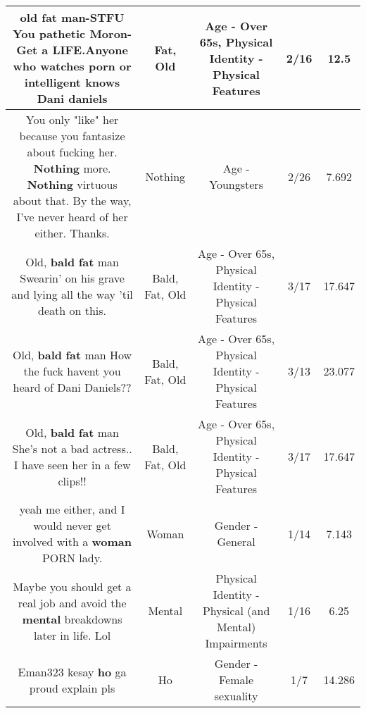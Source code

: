\documentclass[11pt]{article}
\newlength\mylength
\begin{document}
\begin{center}
\begin{longtable}{|C{.65\mylength}|C{.30\mylength}|C{.12\mylength}|C{.12\mylength}|C{.12\mylength}|}
  \small old \textbf{fat} man-STFU You pathetic Moron-Get a LIFE.Anyone who watches porn or intelligent knows Dani daniels\normalsize   & Fat, Old & Age - Over 65s, Physical Identity - Physical Features & 2/16 & 12.5 \\  \hline
  \small You only "like" her because you fantasize about fucking her. \textbf{Nothing} more. \textbf{Nothing} virtuous about that. By the way, I've never heard of her either. Thanks.\normalsize   & Nothing & Age - Youngsters & 2/26 & 7.692 \\  \hline
  \small Old, \textbf{bald} \textbf{fat} man Swearin' on his grave and lying all the way 'til death on this.\normalsize   & Bald, Fat, Old & Age - Over 65s, Physical Identity - Physical Features & 3/17 & 17.647 \\  \hline
  \small Old, \textbf{bald} \textbf{fat} man How the fuck havent you heard of Dani Daniels??\normalsize   & Bald, Fat, Old & Age - Over 65s, Physical Identity - Physical Features & 3/13 & 23.077 \\  \hline
  \small Old, \textbf{bald} \textbf{fat} man She's not a bad actress.. I have seen her in a few clips!!\normalsize   & Bald, Fat, Old & Age - Over 65s, Physical Identity - Physical Features & 3/17 & 17.647 \\  \hline
  \small yeah me either, and I would never get involved with a \textbf{woman} PORN lady.\normalsize   & Woman & Gender - General & 1/14 & 7.143 \\  \hline
  \small Maybe you should get a real job and avoid the \textbf{mental} breakdowns later in life.   Lol\normalsize   & Mental & Physical Identity - Physical (and Mental) Impairments & 1/16 & 6.25 \\  \hline
  \small Eman323  kesay \textbf{ho} ga proud  explain pls\normalsize   & Ho & Gender - Female sexuality & 1/7 & 14.286 \\  \hline

\end{longtable}
\end{center}
\end{document}

